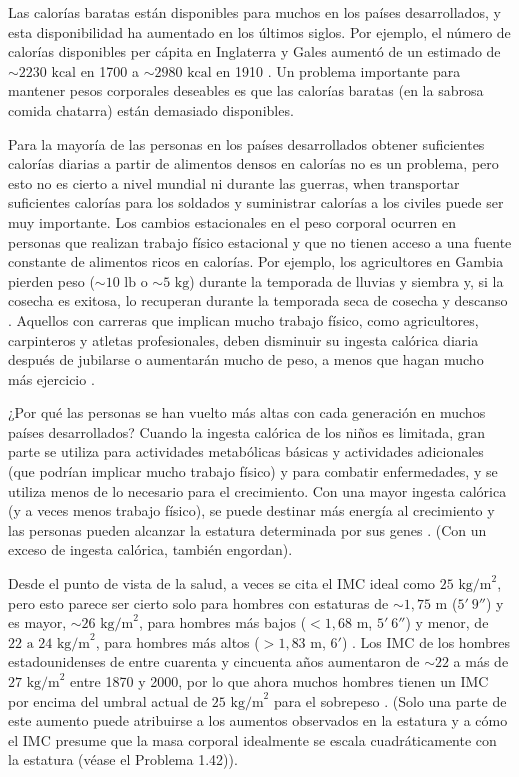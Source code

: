 \documentclass[12pt]{book}
\begin{document}
Las calorías baratas están disponibles para muchos en los países desarrollados, y esta disponibilidad ha aumentado en los últimos siglos. Por ejemplo, el número de calorías disponibles per cápita en Inglaterra y Gales aumentó de un estimado de $\sim 2230\text{ kcal}$ en 1700 a $\sim 2980\text{ kcal}$ en 1910 \cite{34}. Un problema importante para mantener pesos corporales deseables es que las calorías baratas (en la sabrosa comida chatarra) están demasiado disponibles.

Para la mayoría de las personas en los países desarrollados obtener suficientes calorías diarias a partir de alimentos densos en calorías no es un problema, pero esto no es cierto a nivel mundial ni durante las guerras, when transportar suficientes calorías para los soldados y suministrar calorías a los civiles puede ser muy importante. Los cambios estacionales en el peso corporal ocurren en personas que realizan trabajo físico estacional y que no tienen acceso a una fuente constante de alimentos ricos en calorías. Por ejemplo, los agricultores en Gambia pierden peso ($\sim 10\text{ lb}$ o $\sim 5\text{ kg}$) durante la temporada de lluvias y siembra y, si la cosecha es exitosa, lo recuperan durante la temporada seca de cosecha y descanso \cite{56,84,93}. Aquellos con carreras que implican mucho trabajo físico, como agricultores, carpinteros y atletas profesionales, deben disminuir su ingesta calórica diaria después de jubilarse o aumentarán mucho de peso, a menos que hagan mucho más ejercicio \cite{56}.

¿Por qué las personas se han vuelto más altas con cada generación en muchos países desarrollados? Cuando la ingesta calórica de los niños es limitada, gran parte se utiliza para actividades metabólicas básicas y actividades adicionales (que podrían implicar mucho trabajo físico) y para combatir enfermedades, y se utiliza menos de lo necesario para el crecimiento. Con una mayor ingesta calórica (y a veces menos trabajo físico), se puede destinar más energía al crecimiento y las personas pueden alcanzar la estatura determinada por sus genes \cite{56}. (Con un exceso de ingesta calórica, también engordan).

Desde el punto de vista de la salud, a veces se cita el IMC ideal como $25\text{ kg/m}^2$, pero esto parece ser cierto solo para hombres con estaturas de $\sim 1{,}75\text{ m}$ ($5'\ 9''$) y es mayor, $\sim 26\text{ kg/m}^2$, para hombres más bajos ($<1{,}68\text{ m}$, $5'\ 6''$) y menor, de $22\text{ a }24\text{ kg/m}^2$, para hombres más altos ($>1{,}83\text{ m}$, $6'$) \cite{34}. Los IMC de los hombres estadounidenses de entre cuarenta y cincuenta años aumentaron de $\sim 22$ a más de $27\text{ kg/m}^2$ entre 1870 y 2000, por lo que ahora muchos hombres tienen un IMC por encima del umbral actual de $25\text{ kg/m}^2$ para el sobrepeso \cite{34,56}. (Solo una parte de este aumento puede atribuirse a los aumentos observados en la estatura y a cómo el IMC presume que la masa corporal idealmente se escala cuadráticamente con la estatura (véase el Problema 1.42)).
\end{document}
